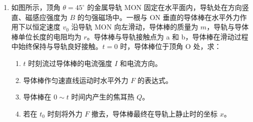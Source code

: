 \documentclass[\gkver]{gaokaozhenti}
\begin{document}
\begin{enumerate}
（可能用到的数据：银河系质量约为 $M=3\times10^{41}\Ukg$，原子质量单位 $1\Uu=1.66\times10^{-27}\Ukg$，$1\Uu$ 相当于 $1.5\times10^{-10}\UJ$ 的能量，电子质量 $m_{e}=0.0005\Uu$，氦核质量 $m_{\alpha}=4.0026\Uu$，氢核质量 $m_{p}=1.0078\Uu$，中微子 $\nu_{e}$ 质量为零）



\item
如图所示，顶角 $\theta=45^{\circ}$ 的金属导轨 MON 固定在水平面内，导轨处在方向竖直、磁感应强度为 $B$ 的匀强磁场中。一根与 ON 垂直的导体棒在水平外力作用下以恒定速度 $v_{0}$ 沿导轨 MON 向左滑动，导体棒的质量为 $m$，导轨与导体棒单位长度的电阻均为 $r$。导体棒与导轨接触点为 a 和 b，导体棒在滑动过程中始终保持与导轨良好接触。$t=0$ 时，导体棒位于顶角 O 处，求：

\begin{enumerate}
	\item
	$t$ 时刻流过导体棒的电流强度 $I$ 和电流方向。
	\item
	导体棒作匀速直线运动时水平外力 $F$ 的表达式。
	\item
	导体棒在 $0\sim t$ 时间内产生的焦耳热 $Q$。
	\item
	若在 $t_{0}$ 时刻将外力 $F$ 撤去，导体棒最终在导轨上静止时的坐标 $x$。
\end{enumerate}


\end{enumerate}
\end{document}
